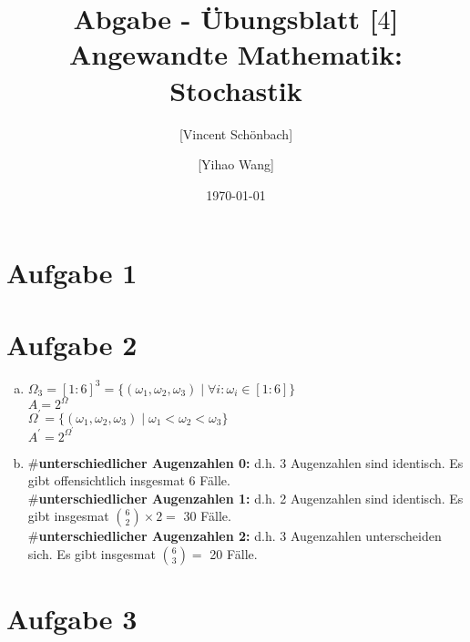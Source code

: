 \documentclass[10pt,a4paper]{article}
\begin{document}
\title{Abgabe - Übungsblatt [$4$]\\
\small{Angewandte Mathematik: Stochastik}}
\author{ [Vincent Schönbach] \and [Yihao Wang]}
\date{\today}
\maketitle

\section*{Aufgabe 1}

\newpage
\section*{Aufgabe 2}
\begin{enumerate}[a)]
 \item 
$\Omega_3 = [1:6]^3 = \{(\omega_1, \omega_2, \omega_3) \mid \forall i: \omega_i \in [1:6]\}$\\
$A = 2 ^ \Omega$\\
$\Omega^\prime = \{(\omega_1, \omega_2, \omega_3) \mid \omega_1 < \omega_2 < \omega_3 \}$\\
$A^\prime  = 2 ^ {\Omega^\prime} $\\
\item

\textbf{$\#$unterschiedlicher Augenzahlen 0:} d.h. 3 Augenzahlen sind identisch. Es gibt offensichtlich insgesmat 6 Fälle.\\
\textbf{$\#$unterschiedlicher Augenzahlen 1:} d.h. 2 Augenzahlen sind identisch. Es gibt insgesmat 
$\binom{6}{2} \times 2 = $ 30 Fälle.\\
\textbf{$\#$unterschiedlicher Augenzahlen 2:} d.h. 3 Augenzahlen unterscheiden sich. Es gibt insgesmat 
$\binom{6}{3} = $ 20 Fälle.
\end{enumerate}


\newpage
\section*{Aufgabe 3}

\newpage
\end{document}
